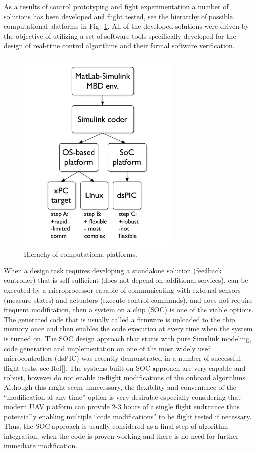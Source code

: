 \documentclass[letterpaper, 10 pt, conference]{ieeeconf}  %
\begin{document}
As a results of control prototyping and fight experimentation a number of solutions has been developed and flight tested, see the hierarchy of possible computational platforms in Fig.~\ref{fig:Platforms}. All of the developed solutions were driven by the objective of utilizing a set of software tools specifically developed for the design of real-time control algorithms and their formal software verification.
\begin{figure}[thpb]
	\centering
	\includegraphics[width=78mm]{Pictures/Figure_01.pdf}
	\caption{Hierachy of computational platforms.}
	\label{fig:Platforms}
\end{figure}

When a design task requires developing a standalone solution (feedback controller) that is self sufficient (does not depend on additional services), can be executed by a microprocessor capable of communicating with external sensors (measure states) and actuators (execute control commands), and does not require frequent modification, then  a system on a chip (SOC) is one of the viable options. The generated code that is usually called a firmware is uploaded to the chip memory once and then enables the code execution at every time when the system is turned on. The SOC design approach that starts with pure Simulink modeling, code generation and implementation on one of the most widely used microcontrollers (dsPIC) was recently demonstrated in a number of successful flight tests, see Ref[]. The systems built on SOC approach are very capable and robust, however do not enable in-flight modifications of the onboard algorithms. Although this might seem unnecessary, the flexibility and convenience of the ``modification at any time'' option is very desirable especially considering that modern UAV platform can provide 2-3 hours of a single flight endurance thus potentially enabling multiple ``code modifications'' to be flight tested if necessary. Thus, the SOC approach is usually considered as a final step of algorithm integration, when the code is proven working and there is no need for further immediate modification.
\end{document}
